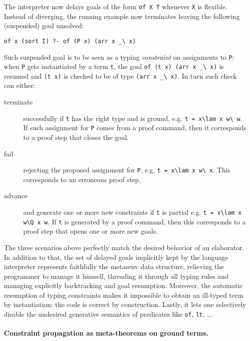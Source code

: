 \documentclass{easychair}
\begin{document}
The interpreter now delays goals of the form \verb+of X T+ whenever \verb+X+
is flexible. Instead of diverging, the running example now
terminates leaving the following (suspended) goal unsolved:

\begin{Verbatim}
of x (sort I) ?- of (P x) (arr x _\ x)
\end{Verbatim}

Such suspended goal is to be seen as a typing \emph{constraint} on
assignments to \verb+P+: when \verb+P+ gets instantiated by a
term \verb+t+, the goal \verb+of (t x) (arr x _\ x)+ is resumed
and \verb+(t x)+ is checked to be of type \verb+(arr x _\ x)+.
In turn such check can either:
\begin{description}
\item[terminate] successfully if \verb+t+ has the right type and is ground,
	e.g. \verb+t = x\lam x w\ w+.  If such assignment for \verb+P+
	comes from a proof command, then it corresponds to a proof
	step that closes the goal.
\item[fail] rejecting the proposed assignment for \verb+P+, e.g. 
	\verb+t = x\lam x w\ x+.  This corresponds to an erroneous proof
	step.
\item[advance] and generate one or more new constraints if \verb+t+ is partial
	e.g. \verb+t = x\lam x w\Q x w+.  If \verb+t+ is generated by
	a proof command, then this corresponds to a proof step that
	opens one or more new goals.
\end{description}
The three scenarios above perfectly match the desired behavior of an
elaborator.  In addition to that, the set of delayed goals implicitly kept
by the language interpreter
represents faithfully the metasenv data structure, relieving the
programmer to manage it himself, threading it through all typing rules and
managing explicitly backtracking and goal resumption.  Moreover, the automatic resumption of typing
constraints makes it impossible to obtain an ill-typed term by
instantiation: the code is correct by construction.  Lastly, it lets one selectively disable the undesired generative semantics of predicates like \verb+of+, \verb+lt+, \ldots.

\paragraph{Constraint propagation as meta-theorems on ground terms.} %
\end{document}
